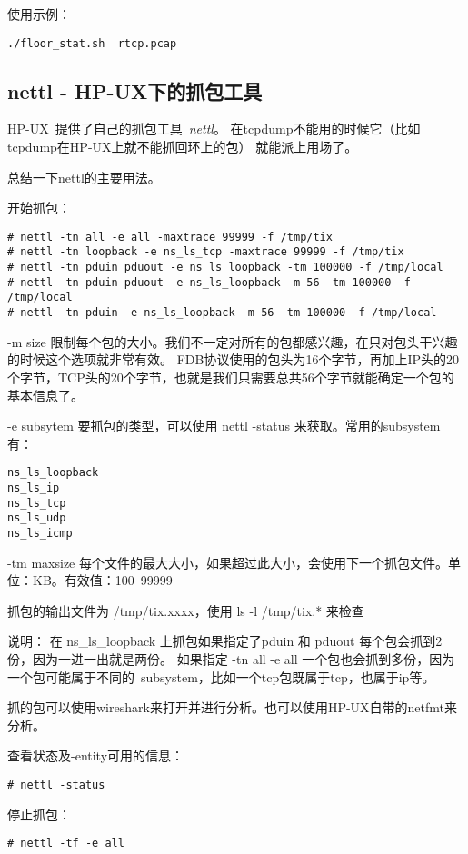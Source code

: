 使用示例：
\begin{lstlisting}
./floor_stat.sh  rtcp.pcap
\end{lstlisting}


\subsection{nettl - HP-UX下的抓包工具}
HP-UX~提供了自己的抓包工具~\emph{nettl}。
在tcpdump不能用的时候它（比如tcpdump在HP-UX上就不能抓回环上的包）
就能派上用场了。

总结一下nettl的主要用法。

开始抓包：
\begin{lstlisting}
# nettl -tn all -e all -maxtrace 99999 -f /tmp/tix
# nettl -tn loopback -e ns_ls_tcp -maxtrace 99999 -f /tmp/tix
# nettl -tn pduin pduout -e ns_ls_loopback -tm 100000 -f /tmp/local
# nettl -tn pduin pduout -e ns_ls_loopback -m 56 -tm 100000 -f /tmp/local
# nettl -tn pduin -e ns_ls_loopback -m 56 -tm 100000 -f /tmp/local
\end{lstlisting}

-m size 限制每个包的大小。我们不一定对所有的包都感兴趣，在只对包头干兴趣的时候这个选项就非常有效。
FDB协议使用的包头为16个字节，再加上IP头的20个字节，TCP头的20个字节，也就是我们只需要总共56个字节就能确定一个包的基本信息了。

-e subsytem 要抓包的类型，可以使用 nettl -status 来获取。常用的subsystem有：
\begin{lstlisting}
ns_ls_loopback
ns_ls_ip
ns_ls_tcp
ns_ls_udp
ns_ls_icmp
\end{lstlisting}

-tm maxsize 每个文件的最大大小，如果超过此大小，会使用下一个抓包文件。单位：KB。有效值：100~99999

抓包的输出文件为 /tmp/tix.xxxx，使用 ls -l /tmp/tix.* 来检查

说明：
在 ns\_ls\_loopback 上抓包如果指定了pduin 和 pduout 每个包会抓到2份，因为一进一出就是两份。
如果指定 -tn all -e all 一个包也会抓到多份，因为一个包可能属于不同的~subsystem，比如一个tcp包既属于tcp，也属于ip等。

抓的包可以使用wireshark来打开并进行分析。也可以使用HP-UX自带的netfmt来分析。

查看状态及-entity可用的信息：
\begin{lstlisting}
# nettl -status
\end{lstlisting}

停止抓包：
\begin{lstlisting}
# nettl -tf -e all
\end{lstlisting}

